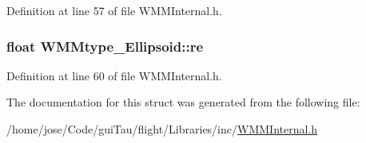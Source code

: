 Definition at line 57 of file W\-M\-M\-Internal.\-h.

\hypertarget{struct_w_m_mtype___ellipsoid_aca51be6e99eef3c6a7a7f16c292e60c5}{
\subsubsection[{re}]{\setlength{\rightskip}{0pt plus 5cm}float W\-M\-Mtype\-\_\-\-Ellipsoid\-::re}}\label{struct_w_m_mtype___ellipsoid_aca51be6e99eef3c6a7a7f16c292e60c5}


Definition at line 60 of file W\-M\-M\-Internal.\-h.



The documentation for this struct was generated from the following file\-:\begin{DoxyCompactItemize}
\item 
/home/jose/\-Code/gui\-Tau/flight/\-Libraries/inc/\hyperlink{_w_m_m_internal_8h}{W\-M\-M\-Internal.\-h}\end{DoxyCompactItemize}
